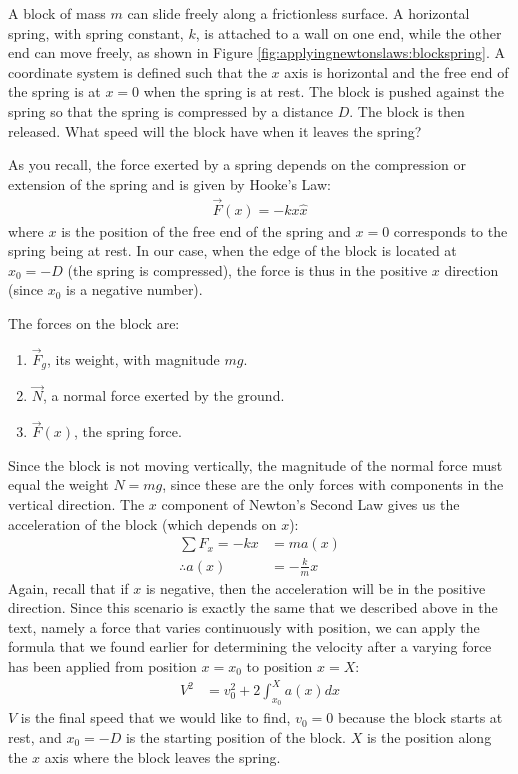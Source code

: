 \begin{example}{\label{ex:applyingnewtonslaws:blockspring}
A block of mass $m$ can slide freely along a frictionless surface. A horizontal spring, with spring constant, $k$, is attached to a wall on one end, while the other end can move freely, as shown in Figure \ref{fig:applyingnewtonslaws:blockspring}. A coordinate system is defined such that the $x$ axis is horizontal and the free end of the spring is at $x=0$ when the spring is at rest. The block is pushed against the spring so that the spring is compressed by a distance $D$. The block is then released. What speed will the block have when it leaves the spring?}

As you recall, the force exerted by a spring depends on the compression or extension of the spring and is given by Hooke's Law:
\begin{align*}
\vec F(x) = -kx\hat x
\end{align*}
where $x$ is the position of the free end of the spring and $x=0$ corresponds to the spring being at rest. In our case, when the edge of the block is located at $x_0=-D$ (the spring is compressed), the force is thus in the positive $x$ direction (since $x_0$ is a negative number). 

The forces on the block are:
\begin{enumerate}
\item $\vec F_g$, its weight, with magnitude $mg$.
\item $\vec N$, a normal force exerted by the ground.
\item $\vec F(x)$, the spring force.
\end{enumerate}
Since the block is not moving vertically, the magnitude of the normal force must equal the weight $N=mg$, since these are the only forces with components in the vertical direction. The $x$ component of Newton's Second Law gives us the acceleration of the block (which depends on $x$):
\begin{align*}
\sum F_x = -kx &= ma(x)\\
\therefore a(x)&=-\frac{k}{m}x
\end{align*}
Again, recall that if $x$ is negative, then the acceleration will be in the positive direction. Since this scenario is exactly the same that we described above in the text, namely a force that varies continuously with position, we can apply the formula that we found earlier for determining the velocity after a varying force has been applied from position $x=x_0$ to position $x=X$:
\begin{align*}
V^2 &= v_0^2 + 2\int_{x_0}^{X}a(x)dx
\end{align*}
$V$ is the final speed that we would like to find, $v_0=0$ because the block starts at rest, and $x_0=-D$ is the starting position of the block. $X$ is the position along the $x$ axis where the block leaves the spring.


\end{example}
